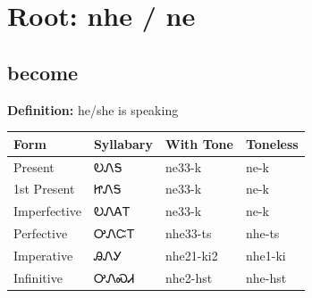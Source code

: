 \documentclass{article}%
\begin{document}
%
\normalsize%
\section*{Root: nhe / ne}%
\subsection*{become}%
\textbf{Definition: }%
he/she is speaking%
\\[0.5em]%
\begin{tabular}{|l|l|l|l|}%
\hline%
\textbf{Form}&\textbf{Syllabary}&\textbf{With Tone}&\textbf{Toneless}\\%
\hline%
Present&ᎧᏁᎦ&ne33{-}k&ne{-}k\\%
1st Present&ᏥᏁᎦ&ne33{-}k&ne{-}k\\%
Imperfective&ᎧᏁᎪᎢ&ne33{-}k&ne{-}k\\%
Perfective&ᎤᏁᏨᎢ&nhe33{-}ts&nhe{-}ts\\%
Imperative&ᎯᏁᎩ&nhe21{-}ki2&nhe1{-}ki\\%
Infinitive&ᎤᏁᏍᏗ&nhe2{-}hst&nhe{-}hst\\%
\hline%
\end{tabular}%
\\[1em]%
\end{document}
